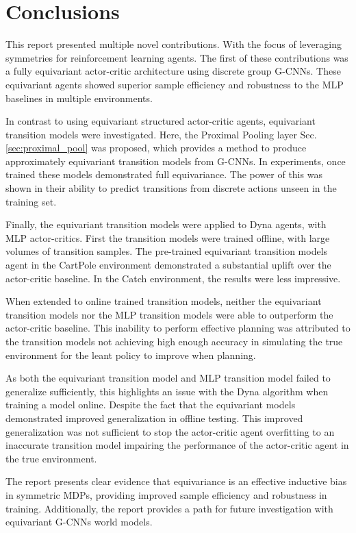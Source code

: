 \chapter{Conclusions}\label{sec:conclusions}
This report presented multiple novel contributions. With the focus of leveraging symmetries for reinforcement learning agents. The first of these contributions was a fully equivariant actor-critic architecture using discrete group G-CNNs. These equivariant agents showed superior sample efficiency and robustness to the MLP baselines in multiple environments.

In contrast to using equivariant structured actor-critic agents, equivariant transition models were investigated. Here, the Proximal Pooling layer Sec.\ref{sec:proximal_pool} was proposed, which provides a method to produce approximately equivariant transition models from G-CNNs. In experiments, once trained these models demonstrated full equivariance. The power of this was shown in their ability to predict transitions from discrete actions unseen in the training set.

Finally, the equivariant transition models were applied to Dyna agents, with MLP actor-critics. First the transition models were trained offline, with large volumes of transition samples. The pre-trained equivariant transition models agent in the CartPole environment demonstrated a substantial uplift over the actor-critic baseline. In the Catch environment, the results were less impressive.

When extended to online trained transition models, neither the equivariant transition models nor the MLP transition models were able to outperform the actor-critic baseline. This inability to perform effective planning was attributed to the transition models not achieving high enough accuracy in simulating the true environment for the leant policy to improve when planning.

As both the equivariant transition model and MLP transition model failed to generalize sufficiently, this highlights an issue with the Dyna algorithm when training a model online. Despite the fact that the equivariant models demonstrated improved generalization in offline testing. This improved generalization was not sufficient to stop the actor-critic agent overfitting to an inaccurate transition model impairing the performance of the actor-critic agent in the true environment.

The report presents clear evidence that equivariance is an effective inductive bias in symmetric MDPs, providing improved sample efficiency and robustness in training. Additionally, the report provides a path for future investigation with equivariant G-CNNs world models.


